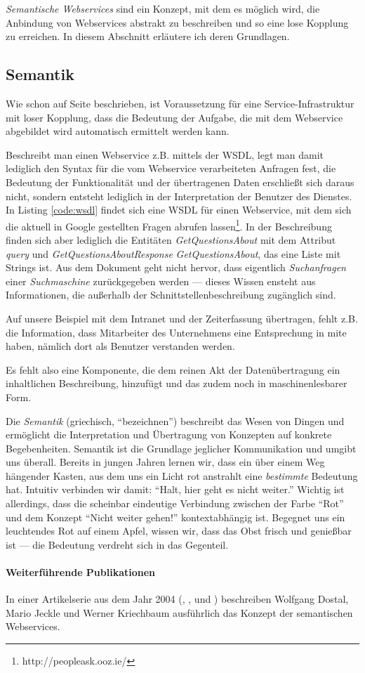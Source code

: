 
\emph{Semantische Webservices} sind ein Konzept, mit dem es möglich wird, die Anbindung von Webservices abstrakt zu beschreiben und so eine lose Kopplung zu erreichen. In diesem Abschnitt erläutere ich deren Grundlagen.

\subsection{Semantik}

Wie schon auf Seite \pageref{l:intro-loosecoupling} beschrieben, ist Voraussetzung für eine Service-Infrastruktur mit loser Kopplung, dass die Bedeutung der Aufgabe, die mit dem Webservice abgebildet wird automatisch ermittelt werden kann.\cite{xmlspek1}

Beschreibt man einen Webservice z.B. mittels der \ac{WSDL}, legt man damit lediglich den Syntax für die vom Webservice verarbeiteten Anfragen fest, die Bedeutung der Funktionalität und der übertragenen Daten erschließt sich daraus nicht, sondern entsteht lediglich in der Interpretation der Benutzer des Dienstes. In Listing \ref{code:wsdl} findet sich eine WSDL für einen Webservice, mit dem sich die aktuell in Google gestellten Fragen abrufen lassen\footnote{http://peopleask.ooz.ie/}. In der Beschreibung finden sich aber lediglich die Entitäten \emph{GetQuestionsAbout} mit dem Attribut \emph{query} und \emph{GetQuestionsAboutResponse} \emph{GetQuestionsAbout}, das eine Liste mit Strings ist. Aus dem Dokument geht nicht hervor, dass eigentlich \emph{Suchanfragen} einer \emph{Suchmaschine} zurückgegeben werden --- dieses Wissen ensteht aus Informationen, die außerhalb der Schnittstellenbeschreibung zugänglich sind.

Auf unsere Beispiel mit dem Intranet und der Zeiterfassung übertragen, fehlt z.B. die Information, dass Mitarbeiter des Unternehmens eine Entsprechung in \ac{mite} haben, nämlich dort als Benutzer verstanden werden.

Es fehlt also eine Komponente, die dem reinen Akt der Datenübertragung ein inhaltlichen Beschreibung, hinzufügt und das zudem noch in maschinenlesbarer Form. \cite{xmlspek2}

Die \emph{Semantik} (griechisch, "`bezeichnen"') beschreibt das Wesen von Dingen und ermöglicht die Interpretation und Übertragung von Konzepten auf konkrete Begebenheiten. Semantik ist die Grundlage jeglicher Kommunikation und umgibt uns überall. Bereits in jungen Jahren lernen wir, dass ein über einem Weg hängender Kasten, aus dem uns ein Licht rot anstrahlt eine \emph{bestimmte} Bedeutung hat. Intuitiv verbinden wir damit: "`Halt, hier geht es nicht weiter."' Wichtig ist allerdings, dass die scheinbar eindeutige Verbindung zwischen der Farbe "`Rot"' und dem Konzept "`Nicht weiter gehen!"' kontextabhängig ist. Begegnet uns ein leuchtendes Rot auf einem Apfel, wissen wir, dass das Obst frisch und genießbar ist --- die Bedeutung verdreht sich in das Gegenteil.

\paragraph{Weiterführende Publikationen} In einer Artikelserie aus dem Jahr 2004 (\cite{xmlspek1}, \cite{xmlspek2}, \cite{xmlspek3} und \cite{xmlspek4}) beschreiben Wolfgang Dostal, Mario Jeckle und Werner Kriechbaum ausführlich das Konzept der semantischen Webservices.